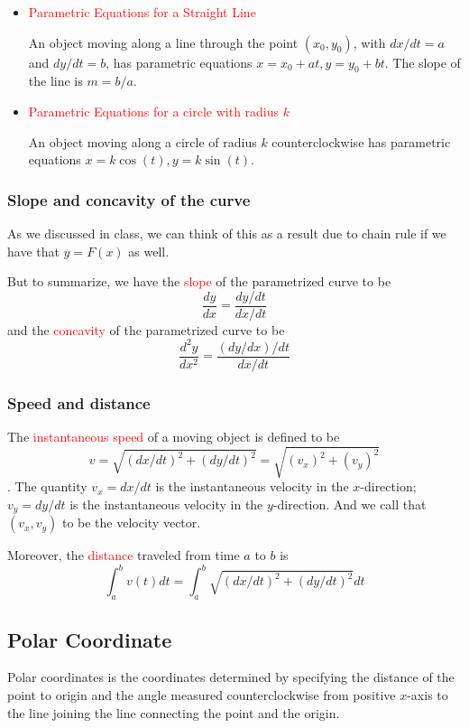 \documentclass[12pt]{article}
\theoremstyle{definition}
\theoremstyle{definition}
\theoremstyle{remark}
\theoremstyle{definition}
\theoremstyle{definition}
\theoremstyle{definition}
\begin{document}
\begin{itemize}
\item \textcolor{red}{Parametric Equations for a Straight Line}

An object moving along a line through the point $(x_0, y_0)$, with $dx/dt = a$ and $dy/dt = b$,
has parametric equations
$x = x_0 + at, y = y_0 + bt$.
The slope of the line is $m = b/a$.
\item\textcolor{red}{Parametric Equations for a circle with radius $k$}

An object moving along a circle of radius $k$ counterclockwise has parametric equations
$x = k\cos(t), y = k\sin(t)$.
\end{itemize}


\subsubsection{Slope and concavity of the curve}
As we discussed in class, we can think of this as a result due to chain rule if we have that $y=F(x)$ as well. 

But to summarize, we have the \textcolor{red}{slope} of the parametrized curve to be 
\[\frac{dy}{dx}=\frac{dy/dt}{dx/dt}\]
and the \textcolor{red}{concavity} of the parametrized curve to be
\[\frac{d^2y}{dx^2}=\frac{(dy/dx)/dt}{dx/dt}\]

\subsubsection{Speed and distance}

The \textcolor{red}{instantaneous speed} of a moving object is defined to be
$$v = \sqrt{(dx/dt)^2 + (dy/dt)^2} =\sqrt{(v_x)^2 + (v_y)^2}$$.
The quantity $v_x = dx/dt$ is the instantaneous velocity in the $x$-direction; $v_y = dy/dt$ is the
instantaneous velocity in the $y$-direction.
And we call that $(v_x,v_y)$ to be the velocity vector.

Moreover, the \textcolor{red}{distance} traveled from time $a$ to $b$ is $$\int^b_a v(t) dt = \int_a^b \sqrt{(dx/dt)^2 + (dy/dt)^2} dt$$

\subsection{Polar Coordinate}

Polar coordinates is the coordinates determined by specifying the distance of the point to origin and the angle measured counterclockwise from positive $x$-axis to the line joining the line connecting the point and the origin.
\end{document}
